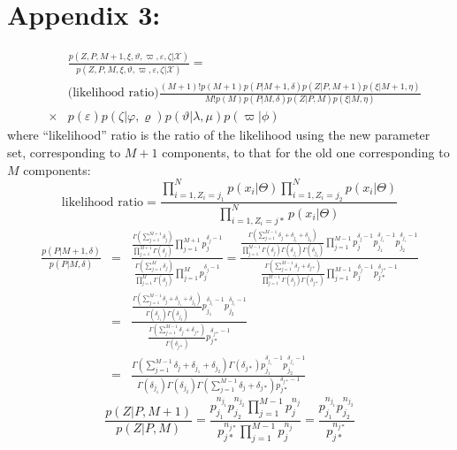 \documentclass[journal,10pt]{elsart}
\begin{document}
\section*{Appendix 3:}\label{appendix3}
\begin{eqnarray}
&&\frac{p(Z,P,M+1,\xi,\vartheta,\varpi,\varepsilon,\zeta|\mathcal{X})}{p(Z,P,M,\xi,\vartheta,\varpi,\varepsilon,\zeta|\mathcal{X})}=\\\nonumber&&\text{(likelihood ratio)}\frac{(M+1)!p(M+1)p(P|M+1,\delta)p(Z|P,M+1)p(\xi|M+1,\eta)}{M!p(M)p(P|M,\delta)p(Z|P,M)p(\xi|M,\eta)} \\\nonumber&\times& p(\varepsilon)p(\zeta|\varphi,\varrho)p(\vartheta|\lambda,\mu)p(\varpi|\phi)
\end{eqnarray}
where ``likelihood'' ratio is the ratio of the likelihood using the new parameter set, corresponding to $M+1$ components,
to that for the old one corresponding to $M$ components:
\begin{equation}
\text{likelihood ratio}=\frac{\prod_{i=1,Z_i=j_1}^N p(x_i|\Theta)\prod_{i=1,Z_i=j_2}^N p(x_i|\Theta)}{\prod_{i=1,Z_i=j*}^N p(x_i|\Theta)}
\end{equation}
\begin{eqnarray}
\nonumber \frac{p(P|M+1,\delta)}{p(P|M,\delta)}&=&\frac{\frac{\Gamma(\sum_{j=1}^{M+1}\delta_j)}{\prod_{j=1}^{M+1}\Gamma(\delta_j)}\prod_{j=1}^{M+1}p_j^{\delta_j-1}}{\frac{\Gamma(\sum_{j=1}^M\delta_j)}{\prod_{j=1}^{M}\Gamma(\delta_j)}\prod_{j=1}^{M}p_j^{\delta_j-1}}
=\frac{\frac{\Gamma(\sum_{j=1}^{M-1}\delta_j+\delta_{j_1}+\delta_{j_2})}{\prod_{j=1}^{M-1}\Gamma(\delta_j)\Gamma(\delta_{j_1})\Gamma(\delta_{j_2})}\prod_{j=1}^{M-1}p_j^{\delta_j-1}p_{j_1}^{\delta_{j_1}-1}p_{j_2}^{\delta_{j_1}-1}}{\frac{\Gamma(\sum_{j=1}^{M-1}\delta_j+\delta_{j*})}{\prod_{j=1}^{M-1}\Gamma(\delta_j)\Gamma(\delta_{j*})}\prod_{j=1}^{M-1}p_j^{\delta_j-1}p_{j*}^{\delta_{j*}-1}}\\\nonumber
&=&\frac{\frac{\Gamma(\sum_{j=1}^{M-1}\delta_j+\delta_{j_1}+\delta_{j_2})}{\Gamma(\delta_{j_1})\Gamma(\delta_{j_2})}p_{j_1}^{\delta_{j_1}-1}p_{j_2}^{\delta_{j_1}-1}}{\frac{\Gamma(\sum_{j=1}^{M-1}\delta_j+\delta_{j*})}{\Gamma(\delta_{j*})}p_{j*}^{\delta_{j*}-1}}\\&=&
\frac{\Gamma(\sum_{j=1}^{M-1}\delta_j+\delta_{j_1}+\delta_{j_2})\Gamma(\delta_{j*})p_{j_1}^{\delta_{j_1}-1}p_{j_2}^{\delta_{j_1}-1}}{\Gamma(\delta_{j_1})\Gamma(\delta_{j_2})\Gamma(\sum_{j=1}^{M-1}\delta_j+\delta_{j*})p_{j*}^{\delta_{j*}-1}}
\end{eqnarray}
\begin{equation}
\frac{p(Z|P,M+1)}{p(Z|P,M)}=\frac{p_{j_{1}}^{{n_{j_{1}}}}p_{j_{2}}^{{n_{j_{2}}}}\prod_{j=1}^{M-1} p_j^{n_j}}{p_{j*}^{{n_{j*}}}\prod_{j=1}^{M-1} p_j^{n_j}}=\frac{p_{j_{1}}^{{n_{j_{1}}}}p_{j_{2}}^{{n_{j_{2}}}}}{p_{j*}^{{n_{j*}}}}
\end{equation}
\end{document}
